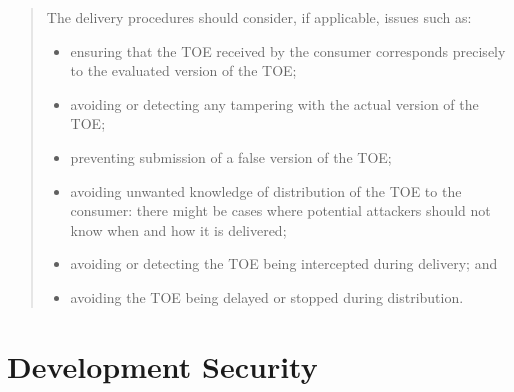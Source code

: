 \begin{quote}
    The delivery procedures should consider, if applicable, issues such as:
    \begin{itemize}
        \item ensuring that the TOE received by the consumer corresponds precisely to the evaluated
            version of the TOE;
        \item avoiding or detecting any tampering with the actual version of the TOE;
        \item preventing submission of a false version of the TOE;
        \item avoiding unwanted knowledge of distribution of the TOE to the consumer: there might be
            cases where potential attackers should not know when and how it is delivered;
        \item avoiding or detecting the TOE being intercepted during delivery; and
        \item avoiding the TOE being delayed or stopped during distribution.
    \end{itemize}
\end{quote}




\section{Development Security}

